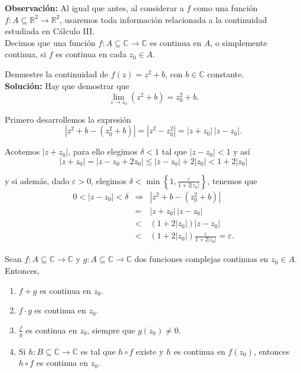 \textbf{Observación:} Al igual que antes, al considerar a $f$ como una función $f: A \subseteq \mathbb{R}^2 \longrightarrow \mathbb{R}^2$, usaremos toda información relacionada a la continuidad estudiada en Cálculo III.
\\

Decimos que una función $f: A\subseteq \mathbb{C} \rightarrow \mathbb{C}$ es continua en $A$, o simplemente continua, si $f$ es continua en cada $z_0 \in A$.

\begin{ejemplo}
Demuestre la continuidad de $f(z) = z^2 + b $, con $b \in \mathbb{C}$ constante.
\\

\textbf{Solución:} Hay que demostrar que 
$$\lim_{z \to z_0}( z^2+b) = z_0^2 +b.$$

Primero desarrollemos la expresión
$$|z^2 +b - (z_0^2 + b)| = |z^2 -z_0^2| = |z+z_0| \, |z-z_0|.$$

Acotemos $|z+z_0|$, para ello elegimos $\delta < 1$ tal que $|z-z_0|< 1$ y así
$$|z+z_0| = |z-z_0 + 2z_0| \leq |z-z_0| + 2|z_0| < 1 + 2|z_0|$$

y si además, dado $\varepsilon >0$, elegimos $\delta < \min \left\{1, \frac{\varepsilon}{1+2|z_0|} \right\}$, tenemos que
\begin{eqnarray*}
0 < |z-z_0| < \delta &\Rightarrow & |z^2 +b - (z_0^2 + b)| \\
&=& |z+z_0| \, |z-z_0| \\
&< & (1+2|z_0|) |z-z_0| \\
&<& (1+2|z_0|) \frac{\varepsilon}{1+2|z_0|} = \varepsilon.
\end{eqnarray*}
\end{ejemplo}

\begin{teorema}
Sean $f: A \subseteq \mathbb{C} \rightarrow \mathbb{C}$ y $g: A \subseteq \mathbb{C} \rightarrow \mathbb{C} $ dos funciones complejas continuas en $z_0 \in A$. Entonces,

\begin{enumerate}
\item $f+g$ es continua en $z_0$.

\item $f\cdot g$ es continua en $z_0$. 

\item $\frac{f}{g}$ es continua en $z_0$, siempre que $g(z_0) \neq 0$.

\item Si $h: B \subseteq \mathbb{C} \rightarrow \mathbb{C}$ es tal que $h \circ f$ existe y $h$ es continua en $f(z_0)$, entonces $h \circ f$ es continua en $z_0$.
\end{enumerate}
\end{teorema}


